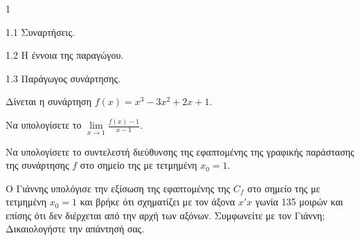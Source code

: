 \begin{ylh}{1}
    \item 1.1 Συναρτήσεις.
    \item 1.2 Η έννοια της παραγώγου.
    \item 1.3 Παράγωγος συνάρτησης.
\end{ylh}
Δίνεται η συνάρτηση $f(x) = x^3 - 3x^2 + 2x + 1$.
\begin{alist}
    \item Να υπολογίσετε το $\displaystyle\lim\limits_{x\to 1} \frac{f(x)-1}{x-1}$. 
    \item Να υπολογίσετε το συντελεστή διεύθυνσης της εφαπτομένης της γραφικής παράστασης της συνάρτησης $f$ στο σημείο της με τετμημένη $x_0 = 1$. 
    \item Ο Γιάννης υπολόγισε την εξίσωση της εφαπτομένης της $C_f$ στο σημείο της με τετμημένη $x_0=1$ και βρήκε ότι σχηματίζει με τον άξονα $x'x$ γωνία 135 μοιρών και επίσης ότι δεν διέρχεται από την αρχή των αξόνων. Συμφωνείτε με τον Γιάννη; Δικαιολογήστε την απάντησή σας. 
\end{alist}

